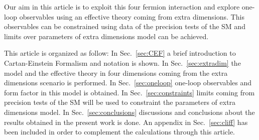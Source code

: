 Our aim in this article is to exploit this four fermion interaction and explore one-loop observables using an effective theory coming from extra dimensions. This observables can be constrained using data of the precision tests of the SM \cite{Altarelli:2004fq,Beringer:1900zz} and limits over parameters of extra dimensions model can be achieved. 

This article is organized as follow: In Sec.~\ref{sec:CEF} a brief introduction to Cartan-Einstein Formalism and notation is shown. In Sec.~\ref{sec:extradim} the model and the effective theory in four dimensions coming from the extra dimensions scenario is performed. In Sec.~\ref{sec:oneloop} one-loop observables and form factor in this model is obtained. In Sec.~\ref{sec:constraints} limits coming from precision tests of the SM will be used to constraint the parameters of extra dimensions model. In Sec.~\ref{sec:conclusions} discussions and conclusions about the results obtained in the present work is done. An appendix in Sec.~\ref{sec:cliff} has been included in order to complement the calculations through this article.